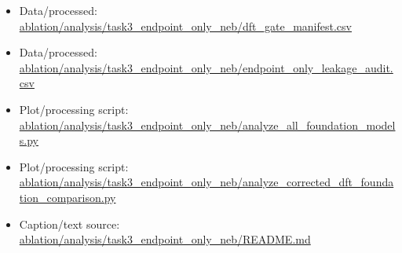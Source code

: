 \begin{itemize}[leftmargin=1.4em,noitemsep]
\item Data/processed: \begingroup\scriptsize\url{ablation/analysis/task3_endpoint_only_neb/dft_gate_manifest.csv}\endgroup
\item Data/processed: \begingroup\scriptsize\url{ablation/analysis/task3_endpoint_only_neb/endpoint_only_leakage_audit.csv}\endgroup
\item Plot/processing script: \begingroup\scriptsize\url{ablation/analysis/task3_endpoint_only_neb/analyze_all_foundation_models.py}\endgroup
\item Plot/processing script: \begingroup\scriptsize\url{ablation/analysis/task3_endpoint_only_neb/analyze_corrected_dft_foundation_comparison.py}\endgroup
\item Caption/text source: \begingroup\scriptsize\url{ablation/analysis/task3_endpoint_only_neb/README.md}\endgroup
\end{itemize}
